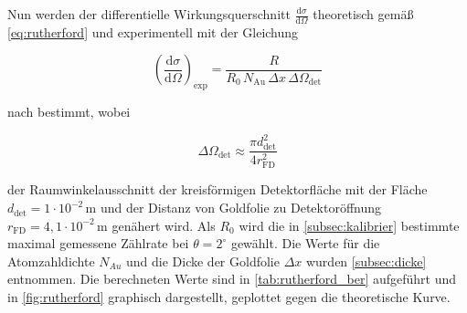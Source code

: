 Nun werden der differentielle Wirkungsquerschnitt $\frac{\mathrm{d}\sigma}{\mathrm{d}\Omega}$ theoretisch gemäß \eqref{eq:rutherford} und experimentell mit der Gleichung

\[
\left(\frac{\mathrm{d}\sigma}{\mathrm{d}\Omega}\right)_{\mathrm{exp}}
=
\frac{R}
{R_0\,N_{\mathrm{Au}}\,\Delta x\,\Delta\Omega_{\mathrm{det}}}
\]

nach \cite{kstateRutherford} bestimmt, wobei 

\[
\Delta\Omega_{\mathrm{det}}
\approx
\frac{\pi d_{\mathrm{det}}^2}{4r_{\mathrm{FD}}^2}
\]

der Raumwinkelausschnitt der kreisförmigen Detektorfläche mit der Fläche\\
$d_{\mathrm{det}} = 1 \cdot 10^{-2}\,\mathrm{m}$  und der Distanz von 
Goldfolie zu Detektoröffnung $r_{\mathrm{FD}} = 4{,}1 \cdot 10^{-2}\,\mathrm{m}$ \cite{tudoV16} genähert wird.
Als $R_0$ wird die in \autoref{subsec:kalibrier} bestimmte maximal gemessene Zählrate bei $\theta = 2^\circ$ gewählt.
Die Werte für die Atomzahldichte $N_{Au}$ und die Dicke der Goldfolie $\Delta x$ wurden \autoref{subsec:dicke} entnommen.
Die berechneten Werte sind in \autoref{tab:rutherford_ber} aufgeführt und in \autoref{fig:rutherford} graphisch dargestellt, geplottet gegen die theoretische Kurve. 

\begin{table}[H]
    \centering
    \caption{Experimentelle differentielle Wirkungsquerschnitte und prozentualer Abweichung vom Theoriewert am Messpunkt.}
    \label{tab:rutherford_ber}
\end{table}

